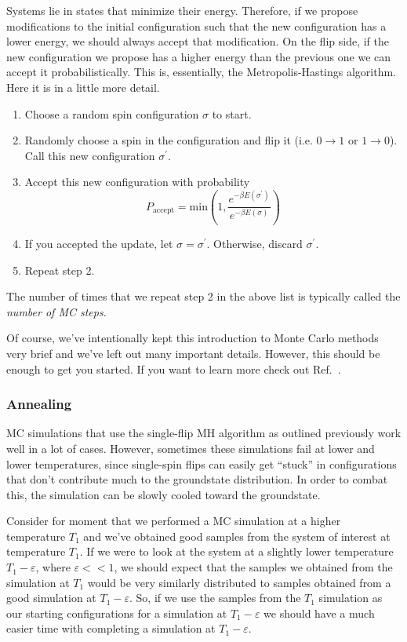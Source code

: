 \documentclass[12pt]{article}
\begin{document}
Systems lie in states that minimize their energy. Therefore, if we propose modifications to the initial configuration such that the new configuration has a lower energy, we should always accept that modification. On the flip side, if the new configuration we propose has a higher energy than the previous one we can accept it probabilistically. This is, essentially, the Metropolis-Hastings algorithm. Here it is in a little more detail. 
\begin{enumerate}
    \item Choose a random spin configuration $\sigma$ to start. 
    \item Randomly choose a spin in the configuration and flip it (i.e. $0 \rightarrow 1$ or $1 \rightarrow 0$). Call this new configuration $\sigma^{\prime}$.
    \item Accept this new configuration with probability
        \begin{equation} \label{eq:acceptance}
            P_{\text{accept}} = \text{min}\left(1, \frac{e^{-\beta E(\sigma^\prime)}}{e^{-\beta E(\sigma)}}\right)
        \end{equation}
    \item If you accepted the update, let $\sigma = \sigma^\prime$. Otherwise, discard $\sigma^\prime$. 
    \item Repeat step 2.
\end{enumerate}
The number of times that we repeat step 2 in the above list is typically called the {\it number of MC steps}.

Of course, we've intentionally kept this introduction to Monte Carlo methods very brief and we've left out many important details. However, this should be enough to get you started. If you want to learn more check out Ref.~\cite{NewmanMC}.

\subsubsection{Annealing}

MC simulations that use the single-flip MH algorithm as outlined previously work well in a lot of cases. However, sometimes these simulations fail at lower and lower temperatures, since single-spin flips can easily get ``stuck'' in configurations that don't contribute much to the groundstate distribution.  In order to combat this, the simulation can be slowly cooled toward the groundstate.

Consider for moment that we performed a MC simulation at a higher temperature $T_1$ and we've obtained good samples from the system of interest at temperature $T_1$. If we were to look at the system at a slightly lower temperature $T_1 - \varepsilon$, where $\varepsilon << 1$, we should expect that the samples we obtained from the simulation at $T_1$ would be very similarly distributed to samples obtained from a good simulation at $T_1 - \varepsilon$. So, if we use the samples from the $T_1$ simulation as our starting configurations for a simulation at $T_1 - \varepsilon$ we should have a much easier time with completing a simulation at $T_1 - \varepsilon$.
\end{document}
